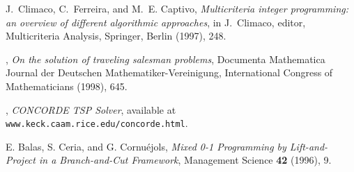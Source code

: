 \begin{thebibliography}{9}


{\sc J.~Climaco, C.~Ferreira, and M.~E. Captivo},
{\em Multicriteria integer programming: an overview of different
  algorithmic approaches},
in J.~Climaco, editor, Multicriteria Analysis,
  Springer, Berlin (1997), 248.

,
{\em On the solution of traveling salesman problems}, Documenta
Mathematica Journal der Deutschen Mathematiker-Vereinigung,
International Congress of Mathematicians (1998), 645.

,
{\em CONCORDE TSP Solver}, available at 
{\tt www.keck.caam.rice.edu/concorde.html}.







 {\sc E. Balas, S. Ceria, and G. Cornu\'ejols}, {\em Mixed
0-1 Programming by Lift-and-Project in a Branch-and-Cut Framework},
Management Science {\bf 42} (1996), 9.


\end{thebibliography}
